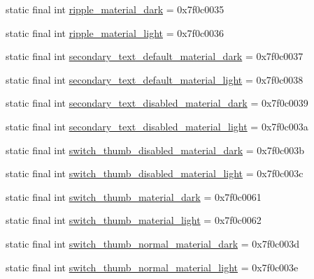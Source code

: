 \begin{CompactItemize}
\item 
static final int \hyperlink{classandroid_1_1support_1_1graphics_1_1drawable_1_1animated_1_1_r_1_1color_ac8dec22289a0bbe350c90170dd68f42}{ripple\_\-material\_\-dark} = 0x7f0c0035
\item 
static final int \hyperlink{classandroid_1_1support_1_1graphics_1_1drawable_1_1animated_1_1_r_1_1color_05fc6b2ce2539a68ac50c62295c17065}{ripple\_\-material\_\-light} = 0x7f0c0036
\item 
static final int \hyperlink{classandroid_1_1support_1_1graphics_1_1drawable_1_1animated_1_1_r_1_1color_be8f89a8a2cc1b9d0edd59dd69d78575}{secondary\_\-text\_\-default\_\-material\_\-dark} = 0x7f0c0037
\item 
static final int \hyperlink{classandroid_1_1support_1_1graphics_1_1drawable_1_1animated_1_1_r_1_1color_42beb15e03b1b31da79990beee81299f}{secondary\_\-text\_\-default\_\-material\_\-light} = 0x7f0c0038
\item 
static final int \hyperlink{classandroid_1_1support_1_1graphics_1_1drawable_1_1animated_1_1_r_1_1color_6109e0a2872d6d5b75b390ed7b26e0de}{secondary\_\-text\_\-disabled\_\-material\_\-dark} = 0x7f0c0039
\item 
static final int \hyperlink{classandroid_1_1support_1_1graphics_1_1drawable_1_1animated_1_1_r_1_1color_415d5bb9808ee451e6ee942060b63c9c}{secondary\_\-text\_\-disabled\_\-material\_\-light} = 0x7f0c003a
\item 
static final int \hyperlink{classandroid_1_1support_1_1graphics_1_1drawable_1_1animated_1_1_r_1_1color_2aefb210fe1aeffd7667c4f610d6e43c}{switch\_\-thumb\_\-disabled\_\-material\_\-dark} = 0x7f0c003b
\item 
static final int \hyperlink{classandroid_1_1support_1_1graphics_1_1drawable_1_1animated_1_1_r_1_1color_082906daad5a102cb9c1999bfaf81ba9}{switch\_\-thumb\_\-disabled\_\-material\_\-light} = 0x7f0c003c
\item 
static final int \hyperlink{classandroid_1_1support_1_1graphics_1_1drawable_1_1animated_1_1_r_1_1color_4a6e9830e30e24cb98e3acb41dc7b732}{switch\_\-thumb\_\-material\_\-dark} = 0x7f0c0061
\item 
static final int \hyperlink{classandroid_1_1support_1_1graphics_1_1drawable_1_1animated_1_1_r_1_1color_022382f60638b6afab8303839cd58a1f}{switch\_\-thumb\_\-material\_\-light} = 0x7f0c0062
\item 
static final int \hyperlink{classandroid_1_1support_1_1graphics_1_1drawable_1_1animated_1_1_r_1_1color_8ca139eb96eae5adaf29080e38f31d4e}{switch\_\-thumb\_\-normal\_\-material\_\-dark} = 0x7f0c003d
\item 
static final int \hyperlink{classandroid_1_1support_1_1graphics_1_1drawable_1_1animated_1_1_r_1_1color_2f1f9fa4abfcc45d059749e518dbf2fe}{switch\_\-thumb\_\-normal\_\-material\_\-light} = 0x7f0c003e
\end{CompactItemize}


